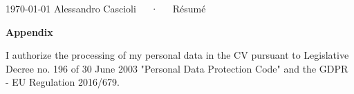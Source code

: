 \documentclass[11pt, a4paper]{awesome-cv}
\begin{document}
\makecvheader[C]

\makecvfooter
{\today}
{Alessandro Cascioli~~~·~~~Résumé}
{\thepage}










\newpage
{}
{\fontsize{24pt}{1em}\selectfont\bfseries\color{darktext} Appendix}







\vfill %

\begin{cvparagraph}
  I authorize the processing of my personal data in the CV pursuant to Legislative Decree no. 196 of 30 June 2003 "Personal Data Protection Code" and the GDPR - EU Regulation 2016/679.
  \vspace{1cm}
\end{cvparagraph}


\end{document}
